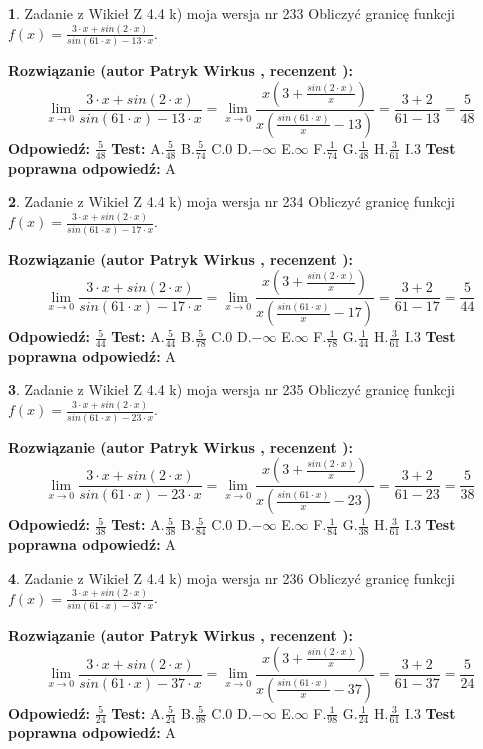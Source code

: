 \documentclass[12pt, a4paper]{article}
\theoremstyle{definition} %
\newtheorem{zad}{}
\newcommand{\zadStart}[1]{\begin{zad}#1\newline}
\newcommand{\zadStop}{\end{zad}}
\newcommand{\rozwStart}[2]{\noindent \textbf{Rozwiązanie (autor #1 , recenzent #2): }\newline}
\newcommand{\rozwStop}{\newline}
\newcommand{\odpStart}{\noindent \textbf{Odpowiedź:}\newline}
\newcommand{\odpStop}{\newline}
\newcommand{\testStart}{\noindent \textbf{Test:}\newline}
\newcommand{\testStop}{\newline}
\newcommand{\kluczStart}{\noindent \textbf{Test poprawna odpowiedź:}\newline}
\newcommand{\kluczStop}{\newline}
\begin{document}
\zadStart{Zadanie z Wikieł Z 4.4 k) moja wersja nr 233}
Obliczyć granicę funkcji $f(x)=\frac{3\cdot x +sin(2\cdot x)}{sin(61\cdot x) -13\cdot x}$.
\zadStop
\rozwStart{Patryk Wirkus}{}
$$\lim\limits_{x\to 0}\frac{3\cdot x +sin(2\cdot x)}{sin(61\cdot x) -13\cdot x}
=\lim\limits_{x\to 0}\frac{x(3+\frac{sin(2\cdot x)}{x})}{x(\frac{sin(61\cdot x)}{x}-13)}
=\frac{3+2}{61-13} = \frac{5}{48}$$
\rozwStop
\odpStart
$\frac{5}{48}$
\odpStop
\testStart
A.$\frac{5}{48}$
B.$\frac{5}{74}$
C.$0$
D.$-\infty$
E.$\infty$
F.$\frac{1}{74}$
G.$\frac{1}{48}$
H.$\frac{3}{61}$
I.$3$
\testStop
\kluczStart
A
\kluczStop



\zadStart{Zadanie z Wikieł Z 4.4 k) moja wersja nr 234}
Obliczyć granicę funkcji $f(x)=\frac{3\cdot x +sin(2\cdot x)}{sin(61\cdot x) -17\cdot x}$.
\zadStop
\rozwStart{Patryk Wirkus}{}
$$\lim\limits_{x\to 0}\frac{3\cdot x +sin(2\cdot x)}{sin(61\cdot x) -17\cdot x}
=\lim\limits_{x\to 0}\frac{x(3+\frac{sin(2\cdot x)}{x})}{x(\frac{sin(61\cdot x)}{x}-17)}
=\frac{3+2}{61-17} = \frac{5}{44}$$
\rozwStop
\odpStart
$\frac{5}{44}$
\odpStop
\testStart
A.$\frac{5}{44}$
B.$\frac{5}{78}$
C.$0$
D.$-\infty$
E.$\infty$
F.$\frac{1}{78}$
G.$\frac{1}{44}$
H.$\frac{3}{61}$
I.$3$
\testStop
\kluczStart
A
\kluczStop



\zadStart{Zadanie z Wikieł Z 4.4 k) moja wersja nr 235}
Obliczyć granicę funkcji $f(x)=\frac{3\cdot x +sin(2\cdot x)}{sin(61\cdot x) -23\cdot x}$.
\zadStop
\rozwStart{Patryk Wirkus}{}
$$\lim\limits_{x\to 0}\frac{3\cdot x +sin(2\cdot x)}{sin(61\cdot x) -23\cdot x}
=\lim\limits_{x\to 0}\frac{x(3+\frac{sin(2\cdot x)}{x})}{x(\frac{sin(61\cdot x)}{x}-23)}
=\frac{3+2}{61-23} = \frac{5}{38}$$
\rozwStop
\odpStart
$\frac{5}{38}$
\odpStop
\testStart
A.$\frac{5}{38}$
B.$\frac{5}{84}$
C.$0$
D.$-\infty$
E.$\infty$
F.$\frac{1}{84}$
G.$\frac{1}{38}$
H.$\frac{3}{61}$
I.$3$
\testStop
\kluczStart
A
\kluczStop



\zadStart{Zadanie z Wikieł Z 4.4 k) moja wersja nr 236}
Obliczyć granicę funkcji $f(x)=\frac{3\cdot x +sin(2\cdot x)}{sin(61\cdot x) -37\cdot x}$.
\zadStop
\rozwStart{Patryk Wirkus}{}
$$\lim\limits_{x\to 0}\frac{3\cdot x +sin(2\cdot x)}{sin(61\cdot x) -37\cdot x}
=\lim\limits_{x\to 0}\frac{x(3+\frac{sin(2\cdot x)}{x})}{x(\frac{sin(61\cdot x)}{x}-37)}
=\frac{3+2}{61-37} = \frac{5}{24}$$
\rozwStop
\odpStart
$\frac{5}{24}$
\odpStop
\testStart
A.$\frac{5}{24}$
B.$\frac{5}{98}$
C.$0$
D.$-\infty$
E.$\infty$
F.$\frac{1}{98}$
G.$\frac{1}{24}$
H.$\frac{3}{61}$
I.$3$
\testStop
\kluczStart
A
\kluczStop
\end{document}
